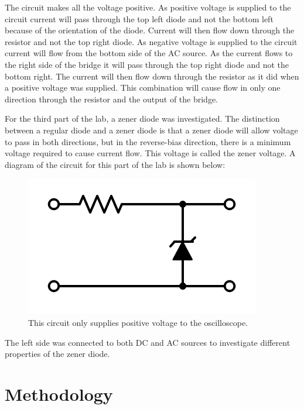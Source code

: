 \documentclass[twocolumn, amsmath]{revtex4}
\begin{document}
The circuit makes all the voltage positive. As positive voltage is supplied to the circuit current will pass through the top left diode and not the bottom left because of the orientation of the diode. Current will then flow down through the resistor and not the top right diode. As negative voltage is supplied to the circuit current will flow from the bottom side of the AC source. As the current flows to the right side of the bridge it will pass through the top right diode and not the bottom right. The current will then flow down through the resistor as it did when a positive voltage was supplied. This combination will cause flow in only one direction through the resistor and the output of the bridge.

For the third part of the lab, a zener diode was investigated. The distinction between a regular diode and a zener diode is that a zener diode will allow voltage to pass in both directions, but in the reverse-bias direction, there is a minimum voltage required to cause current flow. This voltage is called the zener voltage. A diagram of the circuit for this part of the lab is shown below:

\begin{figure}
    \includegraphics[scale=0.3]{zener.png}  
    \caption{This circuit only supplies positive voltage to the oscilloscope.}
\end{figure}

The left side was connected to both DC and AC sources to investigate different properties of the zener diode. 





\section{Methodology}
\end{document}
